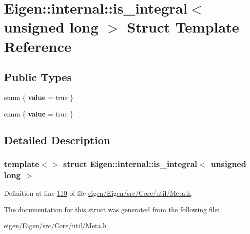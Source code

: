 \hypertarget{struct_eigen_1_1internal_1_1is__integral_3_01unsigned_01long_01_4}{}\section{Eigen\+:\+:internal\+:\+:is\+\_\+integral$<$ unsigned long $>$ Struct Template Reference}
\label{struct_eigen_1_1internal_1_1is__integral_3_01unsigned_01long_01_4}
\subsection*{Public Types}
\begin{DoxyCompactItemize}
\item 
\mbox{\label{struct_eigen_1_1internal_1_1is__integral_3_01unsigned_01long_01_4_a6828a0cfb94999c30c1b5e39b21466bf}} 
enum \{ {\bfseries value} = true
 \}
\item 
\mbox{\label{struct_eigen_1_1internal_1_1is__integral_3_01unsigned_01long_01_4_af7c5b65af2ed01ffa499ab4db6d270c7}} 
enum \{ {\bfseries value} = true
 \}
\end{DoxyCompactItemize}


\subsection{Detailed Description}
\subsubsection*{template$<$$>$\newline
struct Eigen\+::internal\+::is\+\_\+integral$<$ unsigned long $>$}



Definition at line \hyperlink{eigen_2_eigen_2src_2_core_2util_2_meta_8h_source_l00110}{110} of file \hyperlink{eigen_2_eigen_2src_2_core_2util_2_meta_8h_source}{eigen/\+Eigen/src/\+Core/util/\+Meta.\+h}.



The documentation for this struct was generated from the following file\+:\begin{DoxyCompactItemize}
\item 
eigen/\+Eigen/src/\+Core/util/\+Meta.\+h\end{DoxyCompactItemize}

